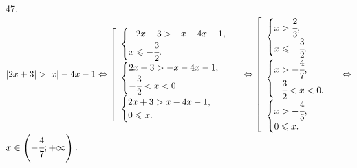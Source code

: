47. $|2x+3|>|x|-4x-1\Leftrightarrow\left[\begin{array}{l} \begin{cases} -2x-3>-x-4x-1,\\
x\leqslant-\cfrac{3}{2}.\end{cases}\\ \begin{cases} 2x+3>-x-4x-1,\\ -\cfrac{3}{2}<x<0.\end{cases} \\ \begin{cases} 2x+3>x-4x-1,\\ 0\leqslant x.\end{cases}\end{array}\right.\Leftrightarrow
\left[\begin{array}{l} \begin{cases} x>\cfrac{2}{3},\\
x\leqslant-\cfrac{3}{2}.\end{cases}\\ \begin{cases} x>-\cfrac{4}{7},\\ -\cfrac{3}{2}<x<0.\end{cases} \\ \begin{cases} x>-\cfrac{4}{5},\\ 0\leqslant x.\end{cases}\end{array}\right.\Leftrightarrow$\\$
x\in\left(-\cfrac{4}{7};+\infty\right).$\\
